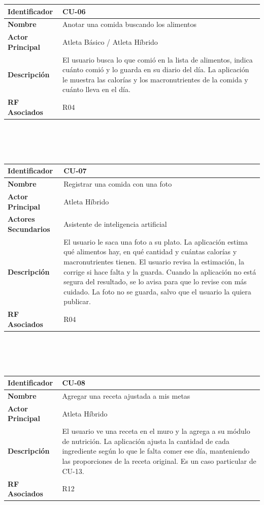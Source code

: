 \newpage
\begin{tabular}{|p{3.5cm}|p{11.5cm}|}
    \hline
    \rowcolor[HTML]{EFEFEF}
    \textbf{Identificador} & \textbf{CU-06} \\ \hline
    \textbf{Nombre} & Anotar una comida buscando los alimentos \\ \hline
    \textbf{Actor Principal} & Atleta Básico / Atleta Híbrido \\ \hline
    \textbf{Descripción} & El usuario busca lo que comió en la lista de alimentos, indica cuánto comió y lo guarda en su diario del día. La aplicación le muestra las calorías y los macronutrientes de la comida y cuánto lleva en el día. \\ \hline
    \textbf{RF Asociados} & R04 \\ \hline
\end{tabular}
\\\\\\
\begin{tabular}{|p{3.5cm}|p{11.5cm}|}
    \hline
    \rowcolor[HTML]{EFEFEF}
    \textbf{Identificador} & \textbf{CU-07} \\ \hline
    \textbf{Nombre} & Registrar una comida con una foto \\ \hline
    \textbf{Actor Principal} & Atleta Híbrido \\ \hline
    \textbf{Actores Secundarios} & Asistente de inteligencia artificial \\ \hline
    \textbf{Descripción} & El usuario le saca una foto a su plato. La aplicación estima qué alimentos hay, en qué cantidad y cuántas calorías y macronutrientes tienen. El usuario revisa la estimación, la corrige si hace falta y la guarda. Cuando la aplicación no está segura del resultado, se lo avisa para que lo revise con más cuidado. La foto no se guarda, salvo que el usuario la quiera publicar. \\ \hline
    \textbf{RF Asociados} & R04 \\ \hline
\end{tabular}
\\\\\\
\begin{tabular}{|p{3.5cm}|p{11.5cm}|}
    \hline
    \rowcolor[HTML]{EFEFEF}
    \textbf{Identificador} & \textbf{CU-08} \\ \hline
    \textbf{Nombre} & Agregar una receta ajustada a mis metas \\ \hline
    \textbf{Actor Principal} & Atleta Híbrido \\ \hline
    \textbf{Descripción} & El usuario ve una receta en el muro y la agrega a su módulo de nutrición. La aplicación ajusta la cantidad de cada ingrediente según lo que le falta comer ese día, manteniendo las proporciones de la receta original. Es un caso particular de CU-13. \\ \hline
    \textbf{RF Asociados} & R12 \\ \hline
\end{tabular}
